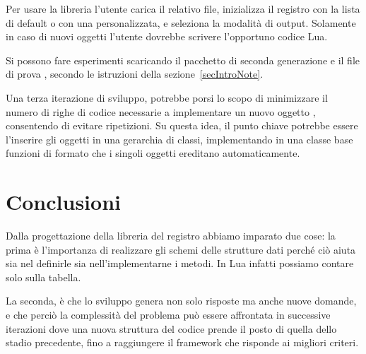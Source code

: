 Per usare la libreria l'utente carica il relativo file, inizializza il registro
con la lista di default o con una personalizzata, e seleziona la modalità di
output. Solamente in caso di nuovi oggetti  l'utente dovrebbe scrivere
l'opportuno codice Lua.

Si possono fare esperimenti scaricando il pacchetto di seconda generazione
 e il file di prova ,
secondo le istruzioni della sezione~\ref{secIntroNote}.

Una terza iterazione di sviluppo, potrebbe porsi lo scopo di minimizzare il
numero di righe di codice necessarie a implementare un nuovo oggetto ,
consentendo di evitare ripetizioni. Su questa idea, il punto chiave potrebbe
essere l'inserire gli oggetti  in una gerarchia di classi,
implementando in una classe base funzioni di formato che i singoli oggetti
ereditano automaticamente.


\section{Conclusioni}

Dalla progettazione della libreria del registro abbiamo imparato due cose: la
prima è l'importanza di realizzare gli schemi delle strutture dati perché ciò
aiuta sia nel definirle sia nell'implementarne i metodi. In Lua infatti possiamo
contare solo sulla tabella.

La seconda, è che lo sviluppo genera non solo risposte ma anche nuove domande, e
che perciò la complessità del problema può essere affrontata in successive
iterazioni dove una nuova struttura del codice prende il posto di quella dello
stadio precedente, fino a raggiungere il framework che risponde ai migliori
criteri.


